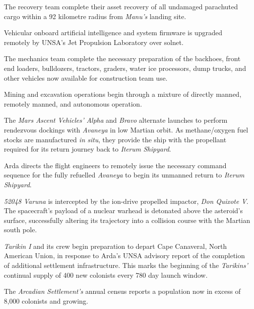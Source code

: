 The recovery team complete their asset recovery of all undamaged parachuted cargo within a 92 kilometre radius from {\it Manu's} landing site.
\StopTimelineDate

Vehicular onboard artificial intelligence and system firmware is upgraded remotely by UNSA's Jet Propulsion Laboratory over solnet.

The mechanics team complete the necessary preparation of the backhoes, front end loaders, bulldozers, tractors, graders, water ice processors, dump trucks, and other vehicles now available for construction team use.

Mining and excavation operations begin through a mixture of directly manned, remotely manned, and autonomous operation.
\StopTimelineDate

The {\it Mars Ascent Vehicles' Alpha} and {\it Bravo} alternate launches to perform rendezvous dockings with {\it Avaneya} in low Martian orbit. As methane/oxygen fuel stocks are manufactured {\it in situ}, they provide the ship with the propellant required for its return journey back to {\it Iterum Shipyard}.
\StopTimelineDate

Arda directs the flight engineers to remotely issue the necessary command sequence for the fully refuelled {\it Avaneya} to begin its unmanned return to {\it Iterum Shipyard}.
\StopTimelineDate

{\it 52048 Varuna} is intercepted by the ion-drive propelled impactor, {\it Don Quixote V}. The spacecraft's payload of a nuclear warhead is detonated above the asteroid's surface, successfully altering its trajectory into a collision course with the Martian south pole.
\StopTimelineDate

{\it Tarikin I} and its crew begin preparation to depart Cape Canaveral, North American Union, in response to Arda's UNSA advisory report of the completion of additional settlement infrastructure. This marks the beginning of the {\it Tarikins'} continual supply of 400 new colonists every 780 day launch window.
\StopTimelineDate

The {\it Arcadian Settlement's} annual census reports a population now in excess of 8,000 colonists and growing.
\StopTimelineDate

